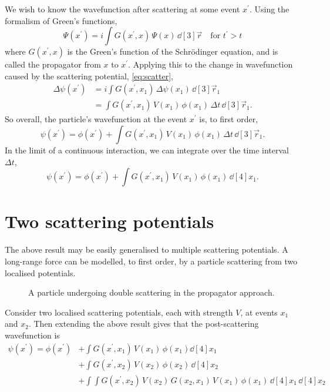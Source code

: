 We wish to know the wavefunction after scattering at some event $x^\prime$. Using the formalism of Green's functions,
\begin{equation}\boxed{
\Psi(x^\prime) = i \int G(x^\prime, x) \, \Psi(x) \, \dd[3]{\vec{r}} \quad \text{for $t^\prime > t$}
}\end{equation}
where $G(x^\prime, x)$ is the Green's function of the Schr{\"o}dinger equation, and is called the propagator from $x$ to $x^\prime$. Applying this to the change in wavefunction caused by the scattering potential, \eqref{eq:scatter},
\begin{align}
\Delta\psi(x^\prime) &= i \int G(x^\prime, x_1) \, \Delta\psi(x_1) \, \dd[3]{\vec{r}_1} \\
&= \int G(x^\prime, x_1) \, V(x_1) \, \phi(x_1) \, \Delta{t} \, \dd[3]{\vec{r}_1}.
\end{align}
So overall, the particle's wavefunction at the event $x^\prime$ is, to first order,
\begin{equation}
\psi(x^\prime) = \phi(x^\prime) +  \int G(x^\prime, x_1) \, V(x_1) \, \phi(x_1) \, \Delta{t} \, \dd[3]{\vec{r}_1}
.\end{equation}
In the limit of a continuous interaction, we can integrate over the time interval $\Delta t$,
\begin{equation}\boxed{
\psi(x^\prime) = \phi(x^\prime) +  \int G(x^\prime, x_1) \, V(x_1) \, \phi(x_1) \, \dd[4]{x_1}
}.\end{equation}

\section{Two scattering potentials}
The above result may be easily generalised to multiple scattering potentials. A long-range force can be modelled, to first order, by a particle scattering from two localised potentials.
\begin{figure}[hb]
\centering

\caption{A particle undergoing double scattering in the propagator approach.\label{eq:doubleScatter}}
\end{figure}

Consider two localised scattering potentials, each with strength $V$, at events $x_1$ and $x_2$. Then extending the above result gives that the post-scattering wavefunction is
\begin{align}
\psi(x^\prime) = \phi(x^\prime) &+ \int G(x^\prime, x_1) \, V(x_1) \, \phi(x_1)  \dd[4]{x_1} \nonumber \\
&+ \int G(x^\prime, x_2) \, V(x_2) \, \phi(x_2) \, \dd[4]{x_2} \nonumber \\
&+ \int \int G(x^\prime, x_2) \, V(x_2) \, G (x_2, x_1) \, V(x_1) \, \phi(x_1) \, \dd[4]{x_1} \, \dd[4]{x_2}\label{eq:doubleScatter}
\end{align}

